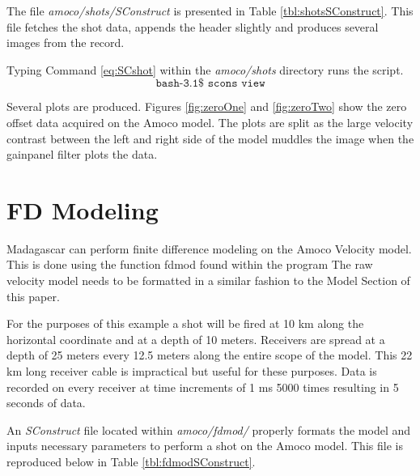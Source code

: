 The file \emph{amoco/shots/SConstruct} is presented in Table \ref{tbl:shotsSConstruct}.  This file fetches the shot 
data, appends the header slightly and produces several images from the record.

{
\tiny

\normalsize
}

Typing Command \ref{eq:SCshot} within the \emph{amoco\slash shots} directory runs the script.
\begin{equation}\label{eq:SCshot} \texttt{bash-3.1\$\ scons\ view} \end{equation}

Several plots are produced.  Figures \ref{fig:zeroOne} and \ref{fig:zeroTwo} show the zero offset data acquired on the Amoco model.  The plots are split as the large velocity contrast between the left and right side of the model muddles the image when the gainpanel filter plots the data.  



\section{FD Modeling}
Madagascar can perform finite difference modeling on the Amoco Velocity model.  This is done using the function fdmod found within the program
The raw velocity model needs to be formatted in a similar fashion to the Model Section of this paper.  

For the purposes of this example a shot will be fired at 10 km along the horizontal coordinate and at a depth of 10 meters.  Receivers are 
spread at a depth of 25 meters every 12.5 meters along the entire scope of the model.  This 22 km long receiver cable is impractical but useful for these 
purposes.  Data is recorded on every receiver at time increments of 1 ms 5000 times resulting in 5 seconds of data.    

An \emph{SConstruct} file located within \emph{amoco/fdmod/} properly formats the model and inputs necessary parameters to perform a shot on 
the Amoco model.  This file is reproduced below in Table \ref{tbl:fdmodSConstruct}.

